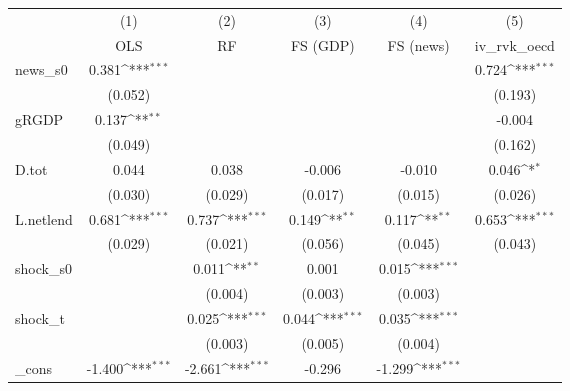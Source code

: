 {
\def\sym#1{\ifmmode^{#1}\else\(^{#1}\)\fi}
\begin{tabular}{l*{5}{c}}
\toprule
            &\multicolumn{1}{c}{(1)}&\multicolumn{1}{c}{(2)}&\multicolumn{1}{c}{(3)}&\multicolumn{1}{c}{(4)}&\multicolumn{1}{c}{(5)}\\
            &\multicolumn{1}{c}{OLS}&\multicolumn{1}{c}{RF}&\multicolumn{1}{c}{FS (GDP)}&\multicolumn{1}{c}{FS (news)}&\multicolumn{1}{c}{iv\_rvk\_oecd}\\
\midrule
news\_s0     &       0.381\sym{***}&                     &                     &                     &       0.724\sym{***}\\
            &     (0.052)         &                     &                     &                     &     (0.193)         \\
\addlinespace
gRGDP       &       0.137\sym{**} &                     &                     &                     &      -0.004         \\
            &     (0.049)         &                     &                     &                     &     (0.162)         \\
\addlinespace
D.tot       &       0.044         &       0.038         &      -0.006         &      -0.010         &       0.046\sym{*}  \\
            &     (0.030)         &     (0.029)         &     (0.017)         &     (0.015)         &     (0.026)         \\
\addlinespace
L.netlend   &       0.681\sym{***}&       0.737\sym{***}&       0.149\sym{**} &       0.117\sym{**} &       0.653\sym{***}\\
            &     (0.029)         &     (0.021)         &     (0.056)         &     (0.045)         &     (0.043)         \\
\addlinespace
shock\_s0    &                     &       0.011\sym{**} &       0.001         &       0.015\sym{***}&                     \\
            &                     &     (0.004)         &     (0.003)         &     (0.003)         &                     \\
\addlinespace
shock\_t     &                     &       0.025\sym{***}&       0.044\sym{***}&       0.035\sym{***}&                     \\
            &                     &     (0.003)         &     (0.005)         &     (0.004)         &                     \\
\addlinespace
\_cons      &      -1.400\sym{***}&      -2.661\sym{***}&      -0.296         &      -1.299\sym{***}&                     \\

\end{tabular}}
